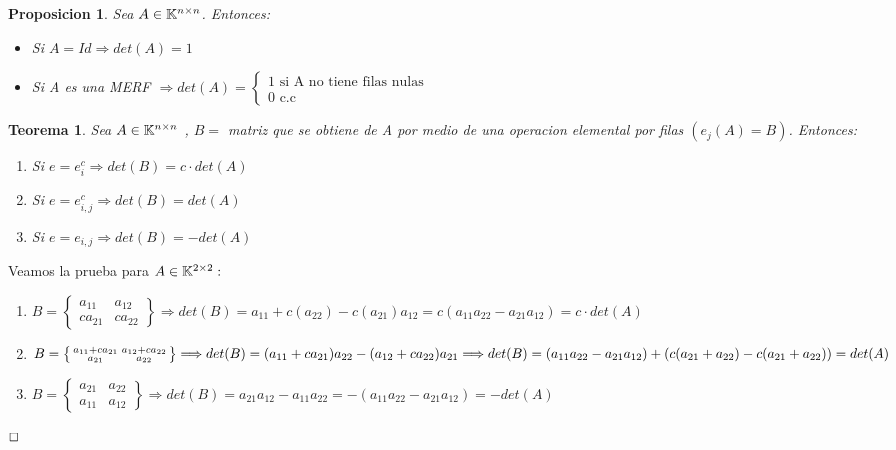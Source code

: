 \documentclass[]{article}
\newtheorem{theorem}{Teorema}
\newtheorem{proposition}{Proposicion}[theorem]
\newenvironment{proof}{\noindent{\bf Prueba:}}{$\hfill \Box$ \vspace{10pt}}
\newcommand{\ida}{\Longrightarrow}
\begin{document}
\begin{proposition}
    Sea $A\in \text{$\mathbb{K}^{n \times n}$}$. Entonces:
    \begin{itemize}
        \item Si $A=Id \ida det(A)=1$
        \item Si A es una MERF $\ida det(A)=\begin{cases} 1 \text{ si A no tiene filas nulas}\\0 \text{ c.c}\end{cases}$
    \end{itemize}
\end{proposition}

\begin{theorem}
    Sea $A \in \text{$\mathbb{K}^{n \times n}$}$ , $B=$ matriz que se obtiene de A por medio de una operacion elemental por filas $(e_j(A)=B)$. Entonces:
    \begin{enumerate}
        \item Si $e= e^{c}_{i} \ida det(B)= c\cdot det(A)$
        \item Si $e= e^{c}_{i,j} \ida det(B)= det(A)$
        \item Si $e= e_{i,j} \ida det(B)= -det(A)$
    \end{enumerate}
\end{theorem}
\begin{proof}
    Veamos la prueba para $A \in \text{$\mathbb{K}^{2 \times 2}$}:$
        \begin{enumerate}
            \item $B=\left\{\begin{smallmatrix} a_{11} & a_{12}\\ ca_{21} & ca_{22} \end{smallmatrix} \right\}
            \ida det(B)= a_{11}+c(a_{22}) - c(a_{21})a_{12} = c(a_{11}a_{22}-a_{21}a_{12}) = c \cdot det(A)$
            \item $B=\left\{ \begin{smallmatrix} a_{11} + ca_{21} & a_{12} + ca_{22}\\ a_{21} & a_{22} \end{smallmatrix} \right\}
            \ida det(B)= (a_{11} + ca_{21}) a_{22} - (a_{12} + ca_{22}) a_{21}\\
            \ida det(B)= (a_{11}a_{22}-a_{21}a_{12}) + (c(a_{21}+a_{22})-c(a_{21}+a_{22}))= det(A)$
            \item $B=\left\{\begin{smallmatrix} a_{21} & a_{22}\\ a_{11} & a_{12} \end{smallmatrix} \right\}
            \ida det(B)= a_{21}a_{12}-a_{11}a_{22} = -(a_{11}a_{22}-a_{21}a_{12}) = -det(A)$
        \end{enumerate}
\end{proof}
\end{document}
